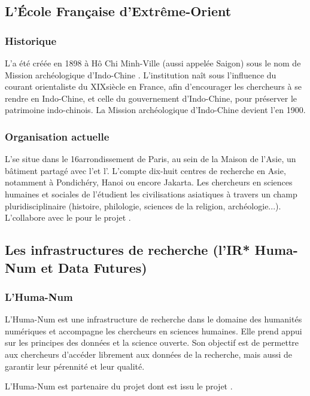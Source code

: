 \subsection{L’École Française d'Extrême-Orient}

\subsubsection{Historique}
L'\EFEO a été créée en 1898 à Hô Chi Minh-Ville (aussi appelée Saigon) sous le nom de \og Mission archéologique d'Indo-Chine \fg. L'institution naît sous l'influence du courant orientaliste du XIX\ieme siècle en France, afin d'encourager les chercheurs à se rendre en Indo-Chine, et celle du gouvernement d'Indo-Chine, pour préserver le patrimoine indo-chinois. La \og Mission archéologique d'Indo-Chine \fg devient l'\EFEO en 1900.

\subsubsection{Organisation actuelle}
L'\EFEO se situe dans le 16\ieme arrondissement de Paris, au sein de la Maison de l'Asie, un bâtiment partagé avec l'\EPHE et l'\EHESS. L'\EFEO compte dix-huit centres de recherche en Asie, notamment à Pondichéry, Hanoi ou encore Jakarta. Les chercheurs en sciences humaines et sociales de l'\EFEO étudient les civilisations asiatiques à travers un champ pluridisciplinaire (histoire, philologie, sciences de la religion, archéologie...). L'\EFEO collabore avec le \cdf pour le projet \COREL. 

\subsection{Les infrastructures de recherche (l'IR* Huma-Num et Data Futures)}
\subsubsection{L'\IR* Huma-Num}
L'\IR* Huma-Num est une infrastructure de recherche dans le domaine des humanités numériques et accompagne les chercheurs en sciences humaines. Elle prend appui sur les principes \fair des données et la science ouverte. Son objectif est de permettre aux chercheurs d'accéder librement aux données de la recherche, mais aussi de garantir leur pérennité et leur qualité. 

L'\IR* Huma-Num est partenaire du projet \LSC dont est issu le projet \COREL. 

